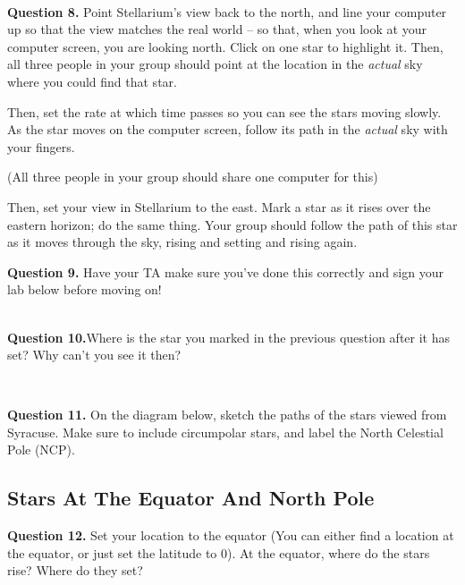 \documentclass[11pt]{article}
\begin{document}
\hrulefill\\

\textbf{Question 8.} Point Stellarium's view back to the north, and line your computer up so that the view matches the real world --
so that, when you look at your computer screen, you are looking north. Click on one star to highlight it. Then, all three people
in your group should point at the location in the {\it actual} sky where you could find that star. 

Then, set the rate at which time passes so you can see the stars moving slowly. As the star moves on the computer screen, follow
its path in the {\it actual} sky with your fingers.

(All three people in your group should share one computer for this)

Then, set your view in Stellarium to the east. Mark a star as it rises over the eastern horizon; do the same thing. Your group
should follow the path of this star as it moves through the sky, rising and setting and rising again.

\textbf{Question 9.} Have your TA make sure you've done this correctly and sign your lab below before moving on!\\ \\

\hrulefill

\textbf{Question 10.}Where is the star you marked in the previous question after it has set? Why can't you see it then?
\vspace*{1.5cm}

\hrulefill\\

\newpage

\textbf{Question 11.} On the diagram below, sketch the paths of the stars viewed from Syracuse. Make sure to include circumpolar stars, and label the North Celestial Pole (NCP). \\
\vspace*{1.5cm}


\subsection{Stars At The Equator And North Pole}

\textbf{Question 12.} Set your location to the equator (You can either find a location at the equator, or just set the latitude to 0). At the equator, where do the stars rise? Where do they set? \\
\vspace*{1.5cm}
\end{document}
